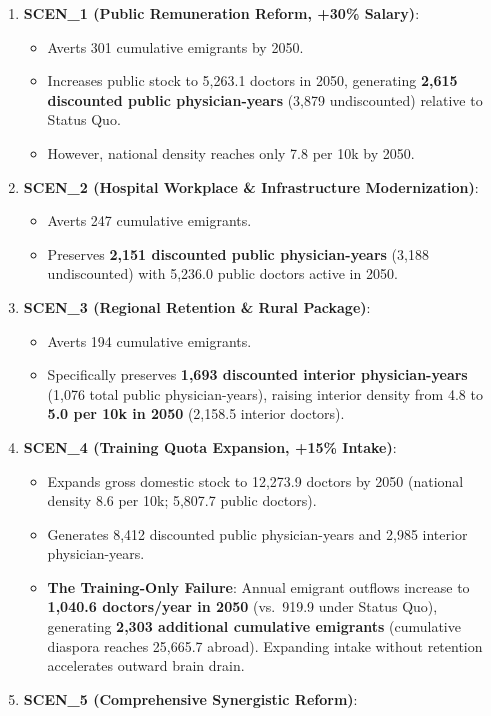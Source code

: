 \documentclass[
  11pt,
  a4paper]{article}
\providecommand{\tightlist}{%
  \setlength{\itemsep}{0pt}\setlength{\parskip}{0pt}}
\begin{document}
\begin{enumerate}
\def\labelenumi{\arabic{enumi}.}
\tightlist
\item
  \textbf{SCEN\_1 (Public Remuneration Reform, +30\% Salary)}:

  \begin{itemize}
  \tightlist
  \item
    Averts 301 cumulative emigrants by 2050.
  \item
    Increases public stock to 5,263.1 doctors in 2050, generating
    \textbf{2,615 discounted public physician-years} (3,879
    undiscounted) relative to Status Quo.
  \item
    However, national density reaches only 7.8 per 10k by 2050.
  \end{itemize}
\item
  \textbf{SCEN\_2 (Hospital Workplace \& Infrastructure Modernization)}:

  \begin{itemize}
  \tightlist
  \item
    Averts 247 cumulative emigrants.
  \item
    Preserves \textbf{2,151 discounted public physician-years} (3,188
    undiscounted) with 5,236.0 public doctors active in 2050.
  \end{itemize}
\item
  \textbf{SCEN\_3 (Regional Retention \& Rural Package)}:

  \begin{itemize}
  \tightlist
  \item
    Averts 194 cumulative emigrants.
  \item
    Specifically preserves \textbf{1,693 discounted interior
    physician-years} (1,076 total public physician-years), raising
    interior density from 4.8 to \textbf{5.0 per 10k in 2050} (2,158.5
    interior doctors).
  \end{itemize}
\item
  \textbf{SCEN\_4 (Training Quota Expansion, +15\% Intake)}:

  \begin{itemize}
  \tightlist
  \item
    Expands gross domestic stock to 12,273.9 doctors by 2050 (national
    density 8.6 per 10k; 5,807.7 public doctors).
  \item
    Generates 8,412 discounted public physician-years and 2,985 interior
    physician-years.
  \item
    \textbf{The Training-Only Failure}: Annual emigrant outflows
    increase to \textbf{1,040.6 doctors/year in 2050} (vs.~919.9 under
    Status Quo), generating \textbf{2,303 additional cumulative
    emigrants} (cumulative diaspora reaches 25,665.7 abroad). Expanding
    intake without retention accelerates outward brain drain.
  \end{itemize}
\item
  \textbf{SCEN\_5 (Comprehensive Synergistic Reform)}:


\end{enumerate}
\end{document}
